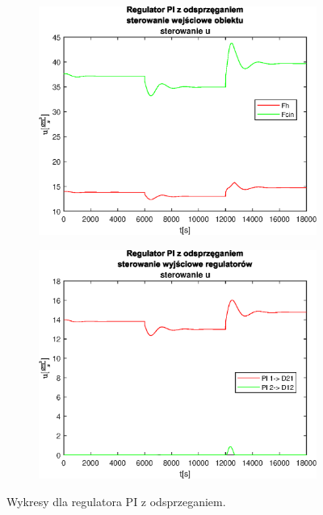 \begin{figure}[h!]
   \begin{subfigure}[b]{0.4\textwidth}
      \includegraphics[width=1\linewidth]{img/PI/decoupler/noDisturbance/PIDecouplerControl2Lintrue.eps}
      \caption{}
      \label{fig:fig:PIDecoupler2Lintrue3}
   \end{subfigure}
       
   \begin{subfigure}[b]{0.4\textwidth}
      \includegraphics[width=1\linewidth]{img/PI/decoupler/noDisturbance/PIDecouplerControlD2Lintrue.eps}
      \caption{}
      \label{fig:fig:PIDecoupler2Lintrue4}
   \end{subfigure}
       
   \caption{Wykresy dla regulatora PI z odsprzeganiem.}
   \label{fig:PIDecoupler2Lintrue}
\end{figure}
           
